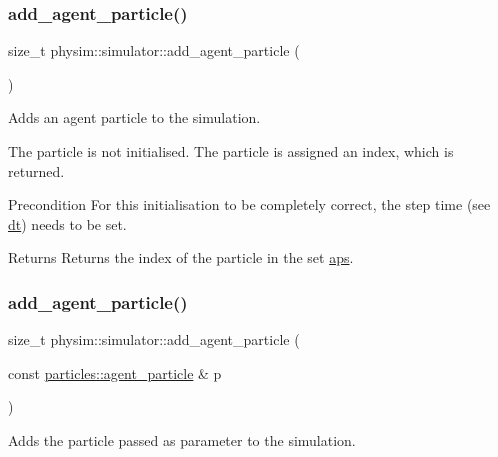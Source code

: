 \subsubsection{\texorpdfstring{add\+\_\+agent\+\_\+particle()}{add\_agent\_particle()}\hspace{0.1cm}{\footnotesize\ttfamily [1/2]}}
{\footnotesize\ttfamily size\+\_\+t physim\+::simulator\+::add\+\_\+agent\+\_\+particle (\begin{DoxyParamCaption}{ }\end{DoxyParamCaption})}



Adds an agent particle to the simulation. 

The particle is not initialised. The particle is assigned an index, which is returned. \begin{DoxyPrecond}{Precondition}
For this initialisation to be completely correct, the step time (see \hyperlink{classphysim_1_1simulator_a12a60d0ed819937b51ce50162dbdd6e1}{dt}) needs to be set. 
\end{DoxyPrecond}
\begin{DoxyReturn}{Returns}
Returns the index of the particle in the set \hyperlink{classphysim_1_1simulator_a838f036ef9d378d1e3f5207c3f031b52}{aps}. 
\end{DoxyReturn}
\mbox{\label{classphysim_1_1simulator_a73e277b53d80d584fd8d72b586ff7b80}} 
\subsubsection{\texorpdfstring{add\+\_\+agent\+\_\+particle()}{add\_agent\_particle()}\hspace{0.1cm}{\footnotesize\ttfamily [2/2]}}
{\footnotesize\ttfamily size\+\_\+t physim\+::simulator\+::add\+\_\+agent\+\_\+particle (\begin{DoxyParamCaption}\item[{const \hyperlink{classphysim_1_1particles_1_1agent__particle}{particles\+::agent\+\_\+particle} \&}]{p }\end{DoxyParamCaption})}



Adds the particle passed as parameter to the simulation. 

